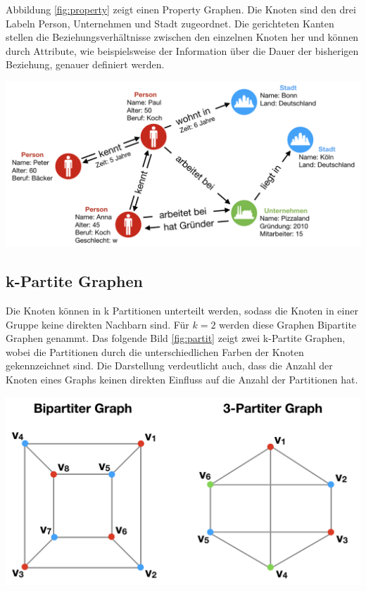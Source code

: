Abbildung \ref{fig:property} zeigt einen Property Graphen.
Die Knoten sind den drei Labeln Person, Unternehmen und Stadt zugeordnet.
Die gerichteten Kanten stellen die Beziehungsverhältnisse zwischen den einzelnen Knoten her und können durch Attribute, wie beispielsweise der Information über die Dauer der bisherigen Beziehung, genauer definiert werden.
\begin{center}
	\includegraphics[scale = 0.65]{./images/Property_graph.png}
	\label{fig:property}
\end{center}
\subsection{k-Partite Graphen}
Die Knoten können in k Partitionen unterteilt werden, sodass die Knoten in einer Gruppe keine direkten Nachbarn sind.
Für $k=2$ werden diese Graphen Bipartite Graphen genammt.
Das folgende Bild \ref{fig:partit} zeigt zwei k-Partite Graphen, wobei die Partitionen durch die unterschiedlichen Farben der Knoten gekennzeichnet sind.
Die Darstellung verdeutlicht auch, dass die Anzahl der Knoten eines Graphs keinen direkten Einfluss auf die Anzahl der Partitionen hat.
\begin{center}
	\includegraphics[scale = 0.4]{./images/k_partiter_graph.png}
	\label{fig:partit}
\end{center}
